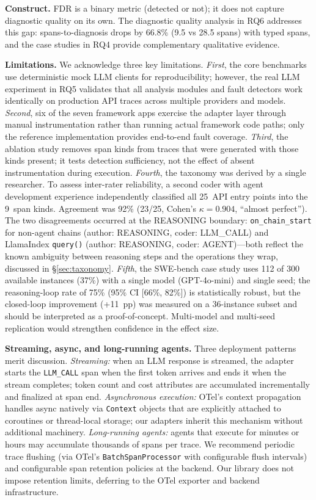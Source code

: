 \documentclass[sigplan,10pt,screen]{acmart}
\begin{document}
\textbf{Construct.}  FDR is a binary metric (detected or not); it does
not capture diagnostic quality on its own.  The diagnostic quality
analysis in RQ6 addresses this gap: spans-to-diagnosis drops by 66.8\%
(9.5 vs 28.5 spans) with typed spans, and the case studies in RQ4 provide
complementary qualitative evidence.

\textbf{Limitations.}  We acknowledge three key limitations.
\emph{First}, the core benchmarks use deterministic mock LLM clients
for reproducibility; however, the real LLM experiment in RQ5 validates
that all analysis modules and fault detectors work identically on
production API traces across multiple providers and models.
\emph{Second}, six of the seven framework apps exercise the adapter
layer through manual instrumentation rather than running actual
framework code paths; only the reference implementation provides
end-to-end fault coverage.
\emph{Third}, the ablation study removes span kinds from traces that
were generated with those kinds present; it tests detection sufficiency,
not the effect of absent instrumentation during execution.
\emph{Fourth}, the taxonomy was derived by a single researcher.
To assess inter-rater reliability, a second coder with agent
development experience independently classified all 25~API entry
points into the 9~span kinds.  Agreement was 92\% (23/25, Cohen's
$\kappa = 0.904$, ``almost perfect'').  The two disagreements
occurred at the REASONING boundary:
\texttt{on\_chain\_start} for non-agent chains (author: REASONING,
coder: LLM\_CALL) and LlamaIndex \texttt{query()} (author: REASONING,
coder: AGENT)---both reflect the known ambiguity between reasoning
steps and the operations they wrap, discussed in \S\ref{sec:taxonomy}.
\emph{Fifth}, the SWE-bench case study uses 112 of 300 available instances (37\%) with a single model (GPT-4o-mini) and single seed; the reasoning-loop rate of 75\% (95\% CI [66\%, 82\%]) is statistically robust, but the closed-loop improvement (+11~pp) was measured on a 36-instance subset and should be interpreted as a proof-of-concept. Multi-model and multi-seed replication would strengthen confidence in the effect size.

\textbf{Streaming, async, and long-running agents.}
Three deployment patterns merit discussion.
\emph{Streaming:} when an LLM response is streamed, the adapter
starts the \texttt{LLM\_CALL} span when the first token arrives and
ends it when the stream completes; token count and cost attributes are
accumulated incrementally and finalized at span end.
\emph{Asynchronous execution:} OTel's context propagation handles
async natively via \texttt{Context} objects that are explicitly
attached to coroutines or thread-local storage; our adapters inherit
this mechanism without additional machinery.
\emph{Long-running agents:} agents that execute for minutes or hours
may accumulate thousands of spans per trace.  We recommend periodic
trace flushing (via OTel's \texttt{BatchSpanProcessor} with
configurable flush intervals) and configurable span retention policies
at the backend.  Our library does not impose retention limits,
deferring to the OTel exporter and backend infrastructure.
\end{document}
